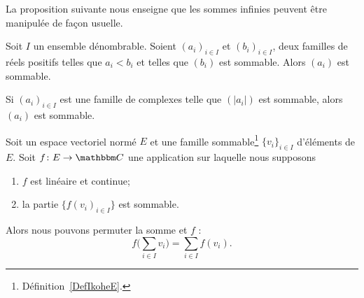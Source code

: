 La proposition suivante nous enseigne que les sommes infinies peuvent être manipulée de façon usuelle.
\begin{proposition} \label{PropMpBStL}
    Soit \( I\) un ensemble dénombrable. Soient \( (a_i)_{i\in I}\) et \( (b_i)_{i\in I}\), deux familles de réels positifs telles que \( a_i<b_i\) et telles que \( (b_i)\) est sommable. Alors \( (a_i)\) est sommable.

    Si \( (a_i)_{i\in I}\) est une famille de complexes telle que \( (| a_i |)\) est sommable, alors \( (a_i)\) est sommable.
\end{proposition}

\begin{proposition}     \label{PROPooWLEDooJogXpQ}
    Soit un espace vectoriel normé \( E\) et une famille sommable\footnote{Définition~\ref{DefIkoheE}.} \( \{ v_i \}_{i\in I}\) d'éléments de \( E\). Soit \( f\colon E\to \eC\) une application sur laquelle nous supposons
    \begin{enumerate}
        \item
            \( f\) est linéaire et continue;
        \item
            la partie \( \{ f(v_i)_{i\in I} \} \) est sommable.
    \end{enumerate}
    Alors nous pouvons permuter la somme et \( f\) :
    \begin{equation}        \label{EQooONHXooKqIEbY}
        f\big( \sum_{i\in I}v_i \big)=\sum_{i\in I}f(v_i).
    \end{equation}
\end{proposition}


